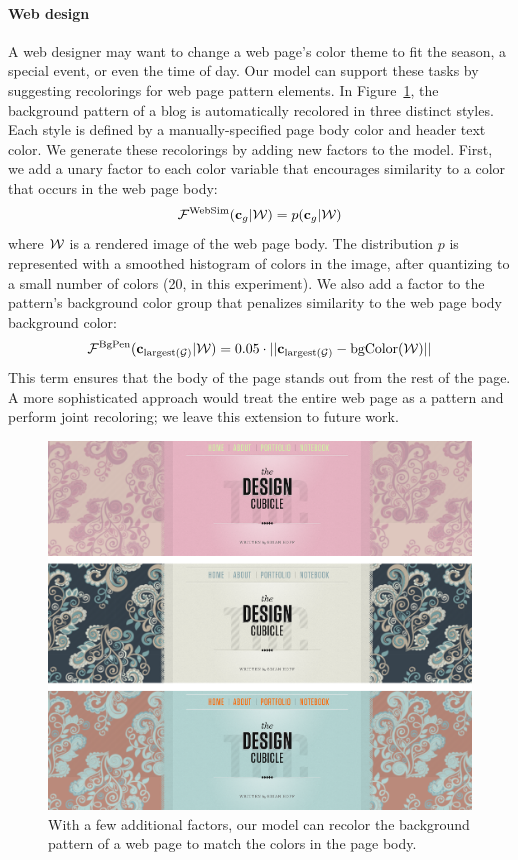 \paragraph{Web design}
A web designer may want to change a web page's color theme to fit the season, a special event, or even the time of day. Our model can support these tasks by suggesting recolorings for web page pattern elements. In Figure~\ref{fig:webpageRecoloring}, the background pattern of a blog is automatically recolored in three distinct styles. Each style is defined by a manually-specified page body color and header text color. We generate these recolorings by adding new factors to the model. First, we add a unary factor to each color variable that encourages similarity to a color that occurs in the web page body:
\begin{equation*}
\mathcal{F}^\textrm{WebSim}(\mathbf{c}_g | \mathcal{W}) = p(\mathbf{c}_g | \mathcal{W})
\end{equation*}
where $\mathcal{W}$ is a rendered image of the web page body. The distribution $p$ is represented with a smoothed histogram of colors in the image, after quantizing to a small number of colors (20, in this experiment).
We also add a factor to the pattern's background color group that penalizes similarity to the web page body background color:
\begin{equation*}
\mathcal{F}^\textrm{BgPen}(\mathbf{c}_{\textrm{largest}(\mathcal{G})} | \mathcal{W}) = 0.05 \cdot || \mathbf{c}_{\textrm{largest}(\mathcal{G})} - \textrm{bgColor}(\mathcal{W}) ||
\end{equation*}
This term ensures that the body of the page stands out from the rest of the page. A more sophisticated approach would treat the entire web page as a pattern and perform joint recoloring; we leave this extension to future work.


\begin{figure}[ht]
\centering
\includegraphics[width=\columnwidth]{figs/webpageRecoloring}
\caption{With a few additional factors, our model can recolor the background pattern of a web page to match the colors in the page body.}
\label{fig:webpageRecoloring}
\end{figure}

